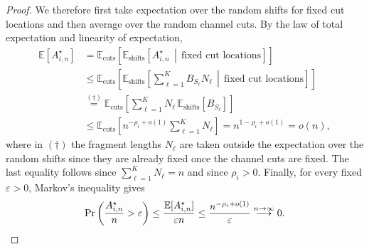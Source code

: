 \documentclass[journal,letterpaper,onecolumn,11pt]{IEEEtran}
\begin{document}
\begin{proof}
We therefore first take expectation over the random shifts  for fixed cut
locations and then average over the random channel cuts.  By the law of
total expectation and linearity of expectation,
\[
\begin{aligned}
\mathbb E[A_{i,n}^{\star}]
&=
\mathbb E_{\mathrm{cuts}}\!\left[
\mathbb E_{\mathrm{shifts}}\!\left[
A_{i,n}^{\star}
\,\middle|\,
\text{fixed cut locations}
\right]
\right]\\
&\leq
\mathbb E_{\mathrm{cuts}}\!\left[
\mathbb E_{\mathrm{shifts}}\!\left[
\sum_{\ell=1}^{K}B_{S_\ell}N_\ell
\,\middle|\,
\text{fixed cut locations}
\right]
\right]\\
&\overset{(\dagger)}{=}
\mathbb E_{\mathrm{cuts}}\!\left[
\sum_{\ell=1}^{K}
N_\ell\,
\mathbb E_{\mathrm{shifts}}[B_{S_\ell}]
\right]\\
&\leq
\mathbb E_{\mathrm{cuts}}\!\left[
n^{-\rho_i+o(1)}
\sum_{\ell=1}^{K}N_\ell
\right]=
n^{1-\rho_i+o(1)}
=
o(n),
\end{aligned}
\]
where in  $(\dagger)$ the fragment lengths \(N_\ell\) are taken outside the
expectation over the random shifts  since they are already fixed once the
channel cuts are fixed.  The last equality follows since
\(\sum_{\ell=1}^{K}N_\ell=n\) and since \(\rho_i>0\).
Finally, for every fixed \(\varepsilon>0\), Markov's inequality gives
\[
\Pr\left(
\frac{A_{i,n}^{\star}}{n}>\varepsilon
\right)
\leq
\frac{\mathbb E[A_{i,n}^{\star}]}{\varepsilon n}
\leq
\frac{n^{-\rho_i+o(1)}}{\varepsilon}
\overset{n\to\infty}{\longrightarrow} 0.\qedhere
\]
\end{proof}
\end{document}
